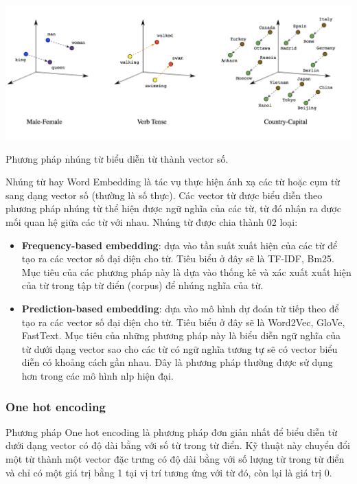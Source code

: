 \documentclass[a4paper, 12pt, openany]{book}
\begin{document}
\begin{minipage}{\linewidth}
    \captionsetup{type=figure}
    \centering
    \includegraphics[width=\linewidth]{./assets/images/word_embedding.png}
    \caption{Phương pháp nhúng từ biểu diễn từ thành vector số.}
\end{minipage}
\vspace{0.5cm}

Nhúng từ hay Word Embedding là tác vụ thực hiện ánh xạ các từ hoặc cụm từ sang dạng vector
số (thường là số thực). Các vector từ được biểu diễn theo phương pháp nhúng từ thể hiện
được ngữ nghĩa của các từ, từ đó nhận ra được mối quan hệ giữa các từ với nhau. Nhúng
từ được chia thành 02 loại:


\begin{itemize}
    \item \textbf{Frequency-based embedding}: dựa vào tần suất xuất hiện của các từ để tạo ra các
    vector số đại diện cho từ. Tiêu biểu ở đây sẽ là TF-IDF, Bm25. Mục tiêu của các phương pháp này là
    dựa vào thống kê và xác xuất xuất hiện của từ trong tập từ điển (corpus) để nhúng nghĩa của từ.

    \item \textbf{Prediction-based embedding}: dựa vào mô hình dự đoán từ tiếp theo để tạo ra các
    vector số đại diện cho từ. Tiêu biểu ở đây sẽ là Word2Vec, GloVe, FastText. Mục tiêu của những
    phương pháp này là biểu diễn ngữ nghĩa của từ dưới dạng vector sao cho 
    các từ có ngữ nghĩa tương tự sẽ có vector biểu diễn có khoảng cách gần nhau. Đây là phương pháp
    thường được sử dụng hơn trong các mô hình \ac{nlp} hiện đại.
\end{itemize}

\subsubsection{One hot encoding}
Phương pháp One hot encoding là phương pháp đơn giản nhất để biểu diễn từ dưới dạng vector có độ dài bằng với số từ trong từ điển.
Kỹ thuật này chuyển đổi một từ thành một vector đặc trưng có độ
dài bằng với số lượng từ trong từ điển và chỉ có một giá trị bằng 1 tại vị trí tương ứng với
từ đó, còn lại là giá trị 0.
\end{document}
